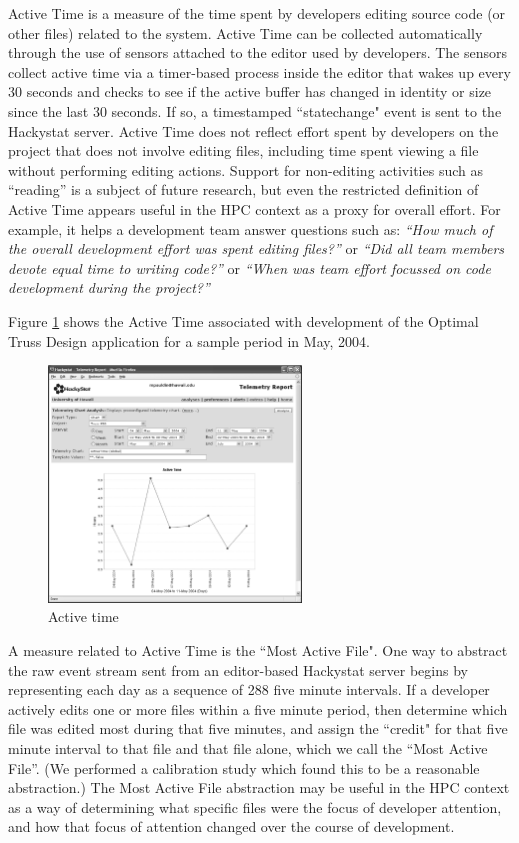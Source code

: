 \documentclass[10pt,twocolumn]{article}
\begin{document}
Active Time is a measure of the time spent by developers editing source
code (or other files) related to the system.  Active Time can be collected
automatically through the use of sensors attached to the editor used by
developers.  The sensors collect active time via a timer-based process
inside the editor that wakes up every 30 seconds and checks to see if the
active buffer has changed in identity or size since the last 30 seconds. If
so, a timestamped ``statechange" event is sent to the Hackystat server.
Active Time does not reflect effort spent by developers on the project that
does not involve editing files, including time spent viewing a file without
performing editing actions. Support for non-editing activities such as
``reading'' is a subject of future research, but even the restricted definition
of Active Time appears useful
in the HPC context as a proxy for overall effort.  For example, it helps a
development team answer questions such as: {\em ``How much of the overall
development effort was spent editing files?''} or {\em ``Did all team
members devote equal time to writing code?''} or {\em ``When was team effort 
focussed on code development during the project?''}

Figure \ref{fig:activetime} shows the Active Time associated with development of the
Optimal Truss Design application for a sample period in May, 2004.

\begin{figure}[htpb]
  \centering
  \includegraphics[width=0.60\textwidth]{truss.activetime2.eps}
  \caption{Active time}
  \label{fig:activetime}
\end{figure}

\label{sec:mostactivefile}

A measure related to Active Time is the ``Most Active File".  One way to
abstract the raw event stream sent from an editor-based Hackystat server
begins by representing each day as a sequence of 288 five minute intervals.
If a developer actively edits one or more files within a five minute
period, then determine which file was edited most during that five minutes,
and assign the ``credit" for that five minute interval to that file and that
file alone, which we call the ``Most Active File''.  (We performed a
calibration study which found this to be a reasonable abstraction.)  The
Most Active File abstraction may be useful in the HPC context as a way of
determining what specific files were the focus of developer attention, and
how that focus of attention changed over the course of development.
\end{document}
